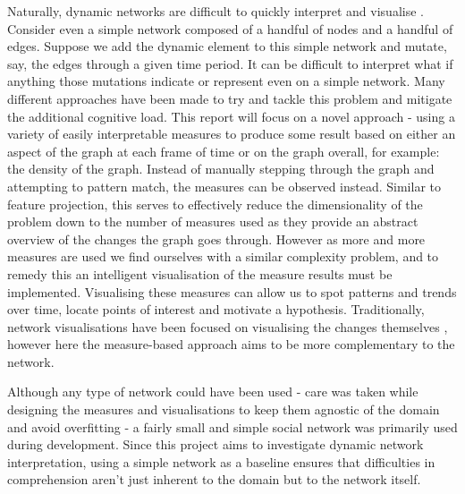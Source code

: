 Naturally, dynamic networks are difficult to quickly interpret and visualise \cite{iddps}. Consider even a simple network composed of a handful of nodes and a handful of edges. Suppose we add the dynamic element to this simple network and mutate, say, the edges through a given time period. It can be difficult to interpret what if anything those mutations indicate or represent even on a simple network. Many different approaches have been made to try and tackle this problem and mitigate the additional cognitive load. This report will focus on a novel approach - using a variety of easily interpretable measures to produce some result based on either an aspect of the graph at each frame of time or on the graph overall, for example: the density of the graph. Instead of manually stepping through the graph and attempting to pattern match, the measures can be observed instead. Similar to feature projection, this serves to effectively reduce the dimensionality \cite{wikidimred} of the problem down to the number of measures used as they provide an abstract overview of the changes the graph goes through. However as more and more measures are used we find ourselves with a similar complexity problem, and to remedy this an intelligent visualisation of the measure results must be implemented. Visualising these measures can allow us to spot patterns and trends over time, locate points of interest and motivate a hypothesis. Traditionally, network visualisations have been focused on visualising the changes themselves \cite{tsotaivg}, however here the measure-based approach aims to be more complementary to the network.

Although any type of network could have been used - care was taken while designing the measures and visualisations to keep them agnostic of the domain and avoid overfitting - a fairly small and simple social network was primarily used during development. 
Since this project aims to investigate dynamic network interpretation, using a simple network as a baseline ensures that difficulties in comprehension aren’t just inherent to the domain but to the network itself. 

